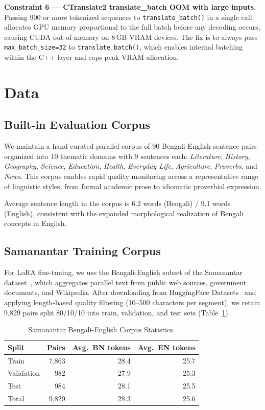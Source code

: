 \documentclass[conference]{IEEEtran}
\begin{document}
\textbf{Constraint 6 --- CTranslate2 translate\_batch OOM with large inputs.}
Passing 900 or more tokenized sequences to \texttt{translate\_batch()} in a single
call allocates GPU memory proportional to the full batch before any decoding occurs,
causing CUDA out-of-memory on 8\,GB VRAM devices.
The fix is to always pass \texttt{max\_batch\_size=32} to \texttt{translate\_batch()},
which enables internal batching within the C++ layer and caps peak VRAM allocation.

\section{Data}

\subsection{Built-in Evaluation Corpus}

We maintain a hand-curated parallel corpus of 90 Bengali-English sentence pairs
organized into 10 thematic domains with 9 sentences each:
\textit{Literature}, \textit{History}, \textit{Geography}, \textit{Science},
\textit{Education}, \textit{Health}, \textit{Everyday Life}, \textit{Agriculture},
\textit{Proverbs}, and \textit{News}.
This corpus enables rapid quality monitoring across a representative range of
linguistic styles, from formal academic prose to idiomatic proverbial expression.

Average sentence length in the corpus is 6.2 words (Bengali) / 9.1 words (English),
consistent with the expanded morphological realization of Bengali concepts in English.

\subsection{Samanantar Training Corpus}

For LoRA fine-tuning, we use the Bengali-English subset of the Samanantar
dataset~\cite{samanantar2022}, which aggregates parallel text from public web sources,
government documents, and Wikipedia.
After downloading from HuggingFace Datasets~\cite{lhoest2021datasets} and applying
length-based quality filtering (10--500 characters per segment), we retain 9,829 pairs
split 80/10/10 into train, validation, and test sets (Table~\ref{tab:corpus}).

\begin{table}[htbp]
\caption{Samanantar Bengali-English Corpus Statistics.}
\label{tab:corpus}
\centering
\begin{tabular}{lrrr}
\toprule
Split & Pairs & Avg.\ BN tokens & Avg.\ EN tokens \\
\midrule
Train & 7,863 & 28.4 & 25.7 \\
Validation & 982 & 27.9 & 25.3 \\
Test & 984 & 28.1 & 25.5 \\
\midrule
Total & 9,829 & 28.3 & 25.6 \\
\bottomrule
\end{tabular}
\end{table}
\end{document}

